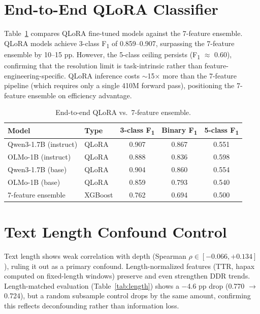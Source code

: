 \documentclass[11pt,a4paper]{article}
\newcommand{\fone}{F\textsubscript{1}}
\newcommand{\rhosp}{\rho}
\begin{document}
\section{End-to-End QLoRA Classifier}
\label{app:qlora}

Table~\ref{tab:qlora} compares QLoRA fine-tuned models against the 7-feature ensemble.
QLoRA models achieve 3-class \fone{} of 0.859--0.907, surpassing the 7-feature ensemble by 10--15 pp.
However, the 5-class ceiling persists (\fone{} $\approx$ 0.60), confirming that the resolution limit is task-intrinsic rather than feature-engineering-specific.
QLoRA inference costs $\sim$15$\times$ more than the 7-feature pipeline (which requires only a single 410M forward pass),
positioning the 7-feature ensemble on efficiency advantage.

\begin{table}[h]
\centering
\caption{End-to-end QLoRA vs.\ 7-feature ensemble.}
\label{tab:qlora}
\begin{tabular}{llccc}
\toprule
\textbf{Model} & \textbf{Type} & \textbf{3-class \fone{}} & \textbf{Binary \fone{}} & \textbf{5-class \fone{}} \\
\midrule
Qwen3-1.7B (instruct) & QLoRA & 0.907 & 0.867 & 0.551 \\
OLMo-1B (instruct) & QLoRA & 0.888 & 0.836 & 0.598 \\
Qwen3-1.7B (base) & QLoRA & 0.904 & 0.860 & 0.554 \\
OLMo-1B (base) & QLoRA & 0.859 & 0.793 & 0.540 \\
\midrule
7-feature ensemble & XGBoost & 0.762 & 0.694 & 0.500 \\
\bottomrule
\end{tabular}
\end{table}

\section{Text Length Confound Control}
\label{app:length}

Text length shows weak correlation with depth (Spearman $\rhosp \in [-0.066, +0.134]$), ruling it out as a primary confound.
Length-normalized features (TTR, hapax computed on fixed-length windows) preserve and even strengthen DDR trends.
Length-matched evaluation (Table~\ref{tab:length}) shows a $-$4.6 pp drop (0.770 $\to$ 0.724), but a random subsample control drops by the same amount,
confirming this reflects deconfounding rather than information loss.
\end{document}

